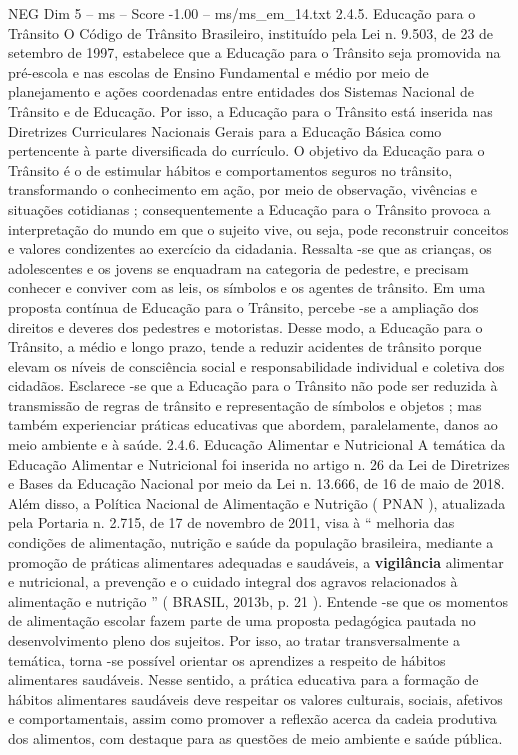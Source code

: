 \begin{textsample}{NEG Dim 5 – ms – Score -1.00 – ms/ms\_em\_14.txt}  \label{ex:f5_neg_074}
2.4.5.
Educação para o Trânsito O Código de Trânsito Brasileiro, instituído pela Lei n. 9.503, de 23 de setembro de 1997, estabelece que a Educação para o Trânsito seja promovida na pré-escola e nas escolas de Ensino Fundamental e médio por meio de planejamento e ações coordenadas entre entidades dos Sistemas Nacional de Trânsito e de Educação.
Por isso, a Educação para o Trânsito está inserida nas Diretrizes Curriculares Nacionais Gerais para a Educação Básica como pertencente à parte diversificada do currículo.
O objetivo da Educação para o Trânsito é o de estimular hábitos e comportamentos seguros no trânsito, transformando o conhecimento em ação, por meio de observação, vivências e situações cotidianas ; consequentemente a Educação para o Trânsito provoca a interpretação do mundo em que o sujeito vive, ou seja, pode reconstruir conceitos e valores condizentes ao exercício da cidadania.
Ressalta -se que as crianças, os adolescentes e os jovens se enquadram na categoria de pedestre, e precisam conhecer e conviver com as leis, os símbolos e os agentes de trânsito.
Em uma proposta contínua de Educação para o Trânsito, percebe -se a ampliação dos direitos e deveres dos pedestres e motoristas.
Desse modo, a Educação para o Trânsito, a médio e longo prazo, tende a reduzir acidentes de trânsito porque elevam os níveis de consciência social e responsabilidade individual e coletiva dos cidadãos.
Esclarece -se que a Educação para o Trânsito não pode ser reduzida à transmissão de regras de trânsito e representação de símbolos e objetos ; mas também experienciar práticas educativas que abordem, paralelamente, danos ao meio ambiente e à saúde. 2.4.6.
Educação Alimentar e Nutricional A temática da Educação Alimentar e Nutricional foi inserida no artigo n. 26 da Lei de Diretrizes e Bases da Educação Nacional por meio da Lei n. 13.666, de 16 de maio de 2018.
Além disso, a Política Nacional de Alimentação e Nutrição ( PNAN ), atualizada pela Portaria n. 2.715, de 17 de novembro de 2011, visa à “ melhoria das condições de alimentação, nutrição e saúde da população brasileira, mediante a promoção de práticas alimentares adequadas e saudáveis, a \textbf{vigilância} alimentar e nutricional, a prevenção e o cuidado integral dos agravos relacionados à alimentação e nutrição ” ( BRASIL, 2013b, p. 21 ).
Entende -se que os momentos de alimentação escolar fazem parte de uma proposta pedagógica pautada no desenvolvimento pleno dos sujeitos.
Por isso, ao tratar transversalmente a temática, torna -se possível orientar os aprendizes a respeito de hábitos alimentares saudáveis.
Nesse sentido, a prática educativa para a formação de hábitos alimentares saudáveis deve respeitar os valores culturais, sociais, afetivos e comportamentais, assim como promover a reflexão acerca da cadeia produtiva dos alimentos, com destaque para as questões de meio ambiente e saúde pública.

\end{textsample}
